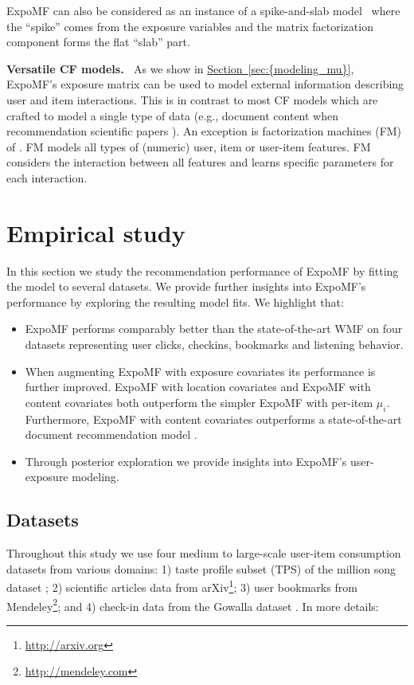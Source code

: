 \documentclass{sig-alternate-arxiv}
\begin{document}
ExpoMF can also be considered as an instance of a spike-and-slab model~\cite{ishwaran2005spike} where the ``spike'' comes from the exposure variables and the matrix factorization component forms the flat ``slab'' part. 

{\vspace{0.1in}\noindent \textbf{{Versatile CF models.} \,}} As we show in {\hyperref[sec:{modeling_mu}]{Section~\ref*{sec:{modeling_mu}}}},
ExpoMF's exposure matrix can be used to model external information describing user
and item interactions. This is in contrast to most CF models which are
crafted to model a single type of data (e.g., document content when
recommendation scientific papers \cite{wang2011collaborative}). An exception is
factorization machines (FM) of \citet{rendle2010fm}. FM models all types of
(numeric) user, item or user-item features. FM considers the interaction
between all features and learns specific parameters for each interaction.

 \section{Empirical study}
\label{sec:experiments}

In this section we study the recommendation performance of ExpoMF by fitting
the model to several datasets. We provide further insights into ExpoMF's
performance by exploring the resulting model fits. We highlight that: 
\begin{itemize} 
\item ExpoMF performs comparably better than the state-of-the-art WMF
\cite{hu2008collaborative} on four datasets representing user clicks, checkins,
bookmarks and listening behavior.
\item When augmenting ExpoMF with exposure covariates its performance is
further improved. ExpoMF with location covariates and ExpoMF with content
covariates both outperform the simpler ExpoMF with per-item $\mu_i$.
Furthermore, ExpoMF with content covariates outperforms a state-of-the-art
document recommendation model \cite{wang2011collaborative}.  
\item Through posterior exploration we provide insights into ExpoMF's user-exposure modeling.
\end{itemize} 

\subsection{Datasets}
Throughout this study we use four medium to large-scale user-item consumption datasets from various domains: 
1) taste profile subset (TPS) of the million song dataset \cite{bertin2011million}; 2) scientific articles data from
arXiv\footnote{\url{http://arxiv.org}}; 3) user bookmarks from Mendeley\footnote{\url{http://mendeley.com}}; and 4) check-in
data from the Gowalla dataset \cite{cho2011friendship}. In more details:
\end{document}
